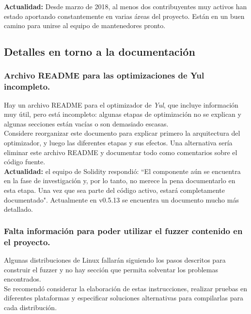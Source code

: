 \textbf{Actualidad:} Desde marzo de 2018\cite{GHContributors2}, al menos dos contribuyentes muy activos han estado aportando constantemente en varias áreas del proyecto. Están en un buen camino para unirse al equipo de mantenedores pronto.\\

\subsection{Detalles en torno a la documentación}

\subsubsection{Archivo README para las optimizaciones de Yul incompleto.}
Hay un archivo README\cite{GHLibjuliaReadme} para el optimizador de \textit{Yul}, que incluye información muy útil, pero está incompleto: algunas etapas de optimización no se explican y algunas secciones están vacías o son demasiado escasas.\\

Considere reorganizar este documento para explicar primero la arquitectura del optimizador, y luego las diferentes etapas y sus efectos. Una alternativa sería eliminar este archivo README y documentar todo como comentarios sobre el código fuente.\\

\textbf{Actualidad:} el equipo de Solidity respondió: “El componente aún se encuentra en la fase de investigación y, por lo tanto, no merece la pena documentarlo en esta etapa. Una vez que sea parte del código activo, estará completamente documentado". Actualmente en v0.5.13 se encuentra un documento\cite{GHYulReadme} mucho más detallado.\\

\subsubsection{Falta información para poder utilizar el fuzzer contenido en el proyecto.}

Algunas distribuciones de Linux fallarán siguiendo los pasos descritos para construir el fuzzer y no hay sección que permita solventar los problemas encontrados.\\

Se recomendó considerar la elaboración de estas instrucciones, realizar pruebas en diferentes plataformas y especificar soluciones alternativas para compilarlas para cada distribución.\\

